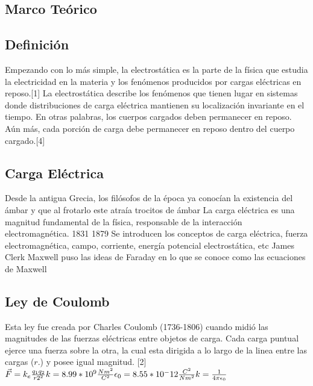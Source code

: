 \documentclass[14pt]{article}
\begin{document}
\begin{multicols}{2}
	\section {Marco Teórico}
	  	
	\subsection{Definición}
	Empezando con lo más simple, la electrostática es la parte de la física que estudia la electricidad en la materia y los
	fenómenos producidos por cargas eléctricas en reposo.[1]
	La electrostática describe los fenómenos que tienen lugar en sistemas donde distribuciones de carga eléctrica mantienen su localización invariante en el tiempo. En
	otras palabras, los cuerpos cargados deben permanecer en reposo. Aún más, cada porción de carga debe permanecer en reposo dentro del cuerpo cargado.[4]
	\subsection{Carga Eléctrica}
	Desde la antigua Grecia, los filósofos de la época ya conocían la existencia del ámbar y que al frotarlo este atraía trocitos de ámbar
	La carga eléctrica es una magnitud fundamental de la física, responsable de la interacción electromagnética.
	1831
	1879 Se introducen los conceptos de carga eléctrica, fuerza
	electromagnética, campo, corriente, energía potencial electrostática, etc
	James Clerk Maxwell puso las ideas de Faraday en lo que se conoce como
	las ecuaciones de Maxwell
	
	\subsection{Ley de Coulomb}
	Esta ley fue creada por Charles Coulomb (1736-1806) cuando midió las magnitudes de las fuerzas eléctricas entre objetos de carga. Cada carga puntual ejerce una fuerza sobre la otra, la cual esta dirigida a lo largo de la linea entre las cargas ($r.$) y posee igual magnitud. [2]\\
	\begin{math}
		 \vec{F} = k_{e} \frac{q_{1}q_{2}}{r{2^2}} \\  
		 k = 8.99*10^9 \frac{Nm^2}{C^2} \\
		 \epsilon_{0} = 8.55*10^-12 \frac{C^2}{Nm^2} \\
		 k = \frac{1}{4 \pi \epsilon_{0}} \\
	\end{math}
	

\end{multicols}
\end{document}
